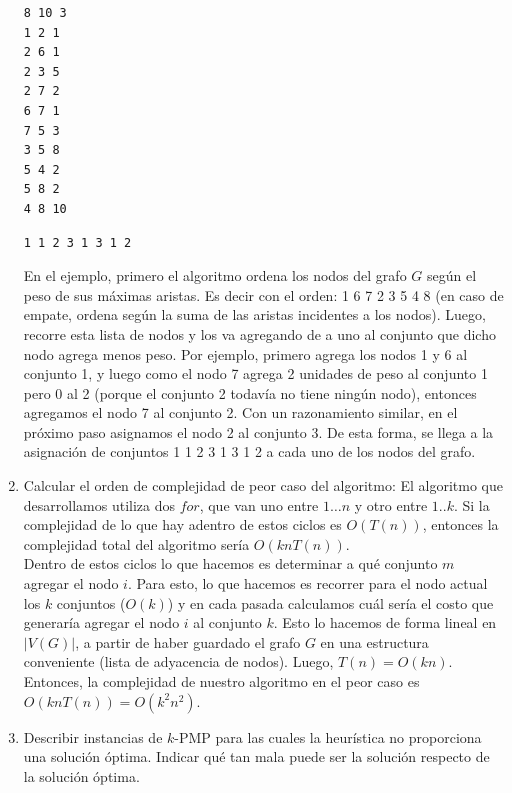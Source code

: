 \documentclass[11pt, a4paper, twoside]{article}
\begin{document}
\begin{enumerate}
\begin{minipage}[t]{0.4\textwidth}
\begin{Verbatim}[frame=single,framesep=1cm,label= Ejemplo de entrada: instancia 1]
8 10 3
1 2 1
2 6 1
2 3 5
2 7 2
6 7 1
7 5 3
3 5 8
5 4 2
5 8 2
4 8 10
\end{Verbatim}
\end{minipage}
\hfill
\begin{minipage}[t]{0.4\textwidth}
\begin{Verbatim}[frame=single,framesep=1cm,label= Ejemplo de salida: instancia 1]
1 1 2 3 1 3 1 2
\end{Verbatim}
\end{minipage}
		
		En el ejemplo, primero el algoritmo ordena los nodos del grafo $G$ según el peso de sus máximas
		aristas. Es decir con el orden: 1 6 7 2 3 5 4 8 (en caso de empate, ordena según la suma de las aristas
		incidentes a los nodos). Luego, recorre esta lista de nodos y los va agregando de a uno al conjunto que
		dicho nodo agrega menos peso. Por ejemplo, primero agrega los nodos 1 y 6 al conjunto 1, y luego como el
		nodo 7 agrega 2 unidades de peso al conjunto 1 pero 0 al 2 (porque el conjunto 2 todavía no tiene ningún
		nodo), entonces agregamos el nodo 7 al conjunto 2. Con un razonamiento similar, en el próximo paso asignamos
		el nodo 2 al conjunto 3. De esta forma, se llega a la asignación de conjuntos 1 1 2 3 1 3 1 2 a cada uno de
		los nodos del grafo.
		
		\item Calcular el orden de complejidad de peor caso del algoritmo:
		El algoritmo que desarrollamos utiliza dos $for$, que van uno entre $1 \dots n$ y otro entre $1..k$.
		Si la complejidad de lo que hay adentro de estos ciclos es $O(T(n))$, entonces la complejidad total
		del algoritmo sería $O(knT(n))$. \\
		Dentro de estos ciclos lo que hacemos es determinar a qué conjunto $m$ agregar el nodo $i$. Para esto,
		lo que hacemos es recorrer para el nodo actual los $k$ conjuntos ($O(k)$) y en cada pasada calculamos 
		cuál sería el costo que generaría agregar el nodo $i$ al conjunto $k$. Esto lo hacemos de forma lineal 
		en $|V(G)|$, a partir de haber guardado el grafo $G$ en una estructura conveniente (lista de adyacencia 
		de nodos). Luego, $T(n) = O(kn)$. \\
		Entonces, la complejidad de nuestro algoritmo en el peor caso es $ O(knT(n)) = O(k^2 n^2)$.
		
		\item Describir instancias de $k$-PMP para las cuales la heurística no proporciona una solución
		óptima. Indicar qué tan mala puede ser la solución respecto de la solución óptima.
		

\end{enumerate}
\end{document}
